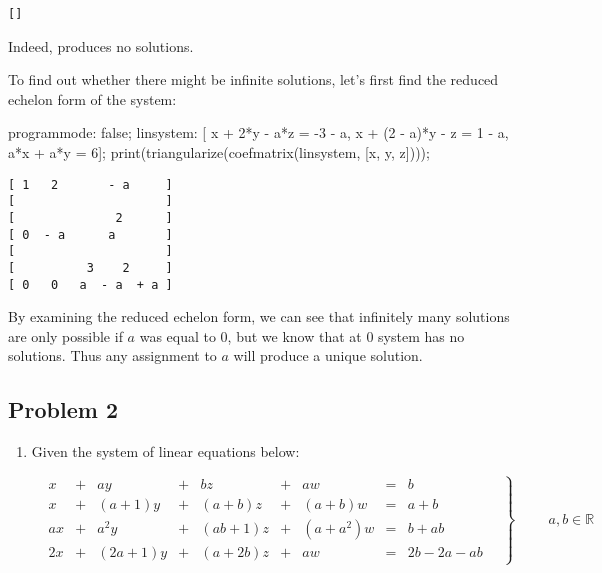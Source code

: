 \documentclass[11pt]{article}
\begin{document}
\begin{verbatim}
[] 
\end{verbatim}

Indeed, produces no solutions.

To find out whether there might be infinite solutions, let's first find
the reduced echelon form of the system:

\begin{maxima}
programmode: false;
linsystem: [  x + 2*y       - a*z = -3 - a,
              x + (2 - a)*y -   z = 1  - a,
            a*x + a*y             = 6];
print(triangularize(coefmatrix(linsystem, [x, y, z])));
\end{maxima}

\begin{verbatim}
[ 1   2       - a     ]
[                     ]
[              2      ]
[ 0  - a      a       ] 
[                     ]
[          3    2     ]
[ 0   0   a  - a  + a ]
\end{verbatim}

By examining the reduced echelon form, we can see that infinitely many
solutions are only possible if $a$ was equal to 0, but we know that at 0
system has no solutions.  Thus any assignment to $a$ will produce a unique
solution.
\subsection{Problem 2}
\label{sec-1-2}

\begin{enumerate}
\item Given the system of linear equations below:

\begin{equation*}
  \left.
    \begin{alignedat}{5}
      &  x & {}+{} & ay        & {}+{} & bz        & {}+{} & aw         & {}={} & b \\
      &  x & {}+{} & (a + 1)y  & {}+{} & (a + b)z  & {}+{} & (a + b)w   & {}={} & a + b \\
      & ax & {}+{} & a^2y      & {}+{} & (ab + 1)z & {}+{} & (a + a^2)w & {}={} & b + ab \\
      & 2x & {}+{} & (2a + 1)y & {}+{} & (a + 2b)z & {}+{} & aw         & {}={} & 2b - 2a - ab
    \end{alignedat}
  \quad \right\} \qquad
  \begin{aligned}
    a, b \in \mathbb{R}
  \end{aligned}
\end{equation*}
\end{enumerate}
\end{document}
